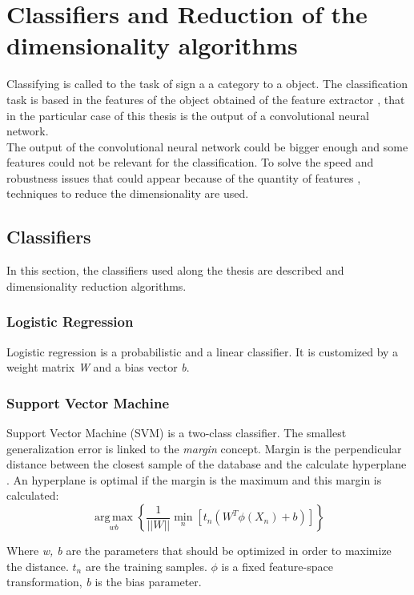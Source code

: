 \section{Classifiers and Reduction of the dimensionality algorithms}
Classifying is called to the task of sign a a category to a object. The classification task is based in the features of the object obtained of the feature extractor \cite{Duda}, that in the particular case of this thesis is the output of a convolutional neural network.\\

The output of the convolutional neural network could be bigger enough and some features could not be relevant for the classification. To solve the speed and robustness issues that could appear because of the quantity of features \cite{PCAvsLDA}, techniques to reduce the dimensionality are used.

\subsection{Classifiers}
In this section, the classifiers used along the thesis are described and dimensionality reduction algorithms.\\

\subsubsection{Logistic Regression}
Logistic regression is a probabilistic and a linear classifier. It is customized by a weight matrix \textit{W} and a bias vector \textit{b}. 

\subsubsection{Support Vector Machine}
Support Vector Machine (SVM) is a two-class classifier. The smallest generalization error is linked  to the \textit{margin} concept. Margin is the perpendicular distance between the closest sample of the database and the calculate hyperplane \cite{MachineLearning}. An hyperplane is optimal if the margin is the maximum and this margin is calculated:\\

\begin{equation}
\underset{w b}{\operatorname{arg\,max}}\left \{ \frac{1}{||W||} \underset{n}{\operatorname{min}}[t_{n}(W^T \phi (X_n)+b)]   \right \}
\end{equation}

Where \textit{w, b} are the parameters that should be optimized in order to maximize the distance. \textit{$t_n$} are the training samples. $\phi$ is a fixed feature-space transformation, \textit{b} is the bias parameter.\\

